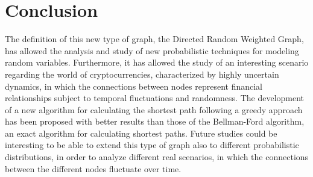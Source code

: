 \section{Conclusion}\label{conclusion}
The definition of this new type of graph, the Directed Random Weighted Graph, has allowed the analysis and study of new probabilistic techniques for modeling random variables. Furthermore, it has allowed the study of an interesting scenario regarding the world of cryptocurrencies, characterized by highly uncertain dynamics, in which the connections between nodes represent financial relationships subject to temporal fluctuations and randomness.
The development of a new algorithm for calculating the shortest path following a greedy approach has been proposed with better results than those of the Bellman-Ford algorithm, an exact algorithm for calculating shortest paths.
Future studies could be interesting to be able to extend this type of graph also to different probabilistic distributions, in order to analyze different real scenarios, in which the connections between the different nodes fluctuate over time.
